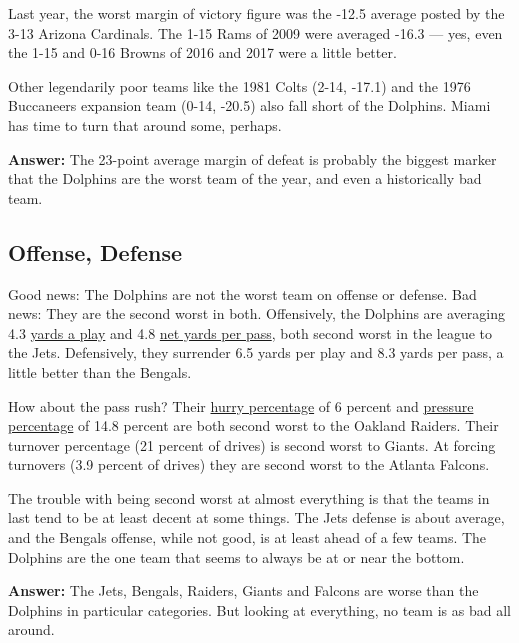 Last year, the worst margin of victory figure was the -12.5 average
posted by the 3-13 Arizona Cardinals. The 1-15 Rams of 2009 were
averaged -16.3 --- yes, even the 1-15 and 0-16 Browns of 2016 and 2017
were a little better.

Other legendarily poor teams like the 1981 Colts (2-14, -17.1) and the
1976 Buccaneers expansion team (0-14, -20.5) also fall short of the
Dolphins. Miami has time to turn that around some, perhaps.

\textbf{Answer:} The 23-point average margin of defeat is probably the
biggest marker that the Dolphins are the worst team of the year, and
even a historically bad team.

\hypertarget{offense-defense}{%
\subsection{Offense, Defense}\label{offense-defense}}

Good news: The Dolphins are not the worst team on offense or defense.
Bad news: They are the second worst in both. Offensively, the Dolphins
are averaging 4.3
\href{https://www.pro-football-reference.com/years/2019/\#team_stats::15}{yards
a play} and 4.8
\href{https://www.pro-football-reference.com/years/2019/\#team_stats::15}{net
yards per pass}, both second worst in the league to the Jets.
Defensively, they surrender 6.5 yards per play and 8.3 yards per pass, a
little better than the Bengals.

How about the pass rush? Their
\href{https://www.pro-football-reference.com/years/2019/opp.htm\#advanced_defense::12}{hurry
percentage} of 6 percent and
\href{https://www.pro-football-reference.com/years/2019/opp.htm\#advanced_defense::17}{pressure
percentage} of 14.8 percent are both second worst to the Oakland
Raiders. Their turnover percentage (21 percent of drives) is second
worst to Giants. At forcing turnovers (3.9 percent of drives) they are
second worst to the Atlanta Falcons.

The trouble with being second worst at almost everything is that the
teams in last tend to be at least decent at some things. The Jets
defense is about average, and the Bengals offense, while not good, is at
least ahead of a few teams. The Dolphins are the one team that seems to
always be at or near the bottom.

\textbf{Answer:} The Jets, Bengals, Raiders, Giants and Falcons are
worse than the Dolphins in particular categories. But looking at
everything, no team is as bad all around.

